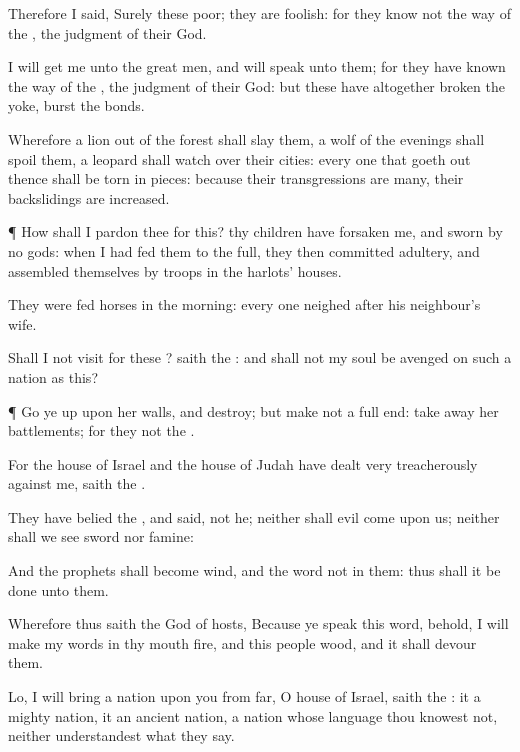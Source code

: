 {Therefore I
said, Surely these
{}
poor; they are
foolish: for they
know not the
way of the
{},
{} the
judgment of their
God.

I will
get me unto the great
men, and will
speak unto them; for they have
known the
way of the
{},
{} the
judgment of their
God: but these have
altogether
broken the
yoke,
{}
burst the
bonds.

Wherefore a
lion out of the
forest shall
slay them,
{} a
wolf of the
evenings shall
spoil them, a
leopard shall
watch over their
cities: every one that goeth
out thence
shall be torn in
pieces: because their
transgressions are
many,
{} their
backslidings are
increased.


\par }{\PP {}¶
How shall I
pardon thee for
this? thy
children have
forsaken me, and
sworn by
{}
no
gods: when I had fed them to the
full, they then committed
adultery, and assembled themselves by
troops in the
harlots’
houses.

They were
{}
fed
horses in the
morning: every
one
neighed after his
neighbour’s
wife.

Shall I not
visit for these
{}?
saith the
{}: and shall not my
soul be
avenged on such a
nation as this?


\par }{\PP {}¶ Go ye
up upon her
walls, and
destroy; but
make not a full
end: take
away her
battlements; for they
{} not the
{}.

For the
house of
Israel and the
house of
Judah have dealt
very
treacherously against me,
saith the
{}.

They have
belied the
{}, and
said,
{} not he; neither shall
evil
come upon us; neither shall we
see
sword nor
famine:

And the
prophets shall become
wind, and the
word
{} not in them: thus shall it be
done unto them.

Wherefore thus
saith the
{}
God of
hosts, Because ye
speak this
word, behold, I will
make my
words in thy
mouth
fire, and this
people
wood, and it shall
devour them.

Lo, I will
bring a
nation upon you from
far, O
house of
Israel,
saith the
{}: it
{} a
mighty
nation, it
{} an
ancient
nation, a
nation whose
language thou
knowest not, neither
understandest what they
say.

}
